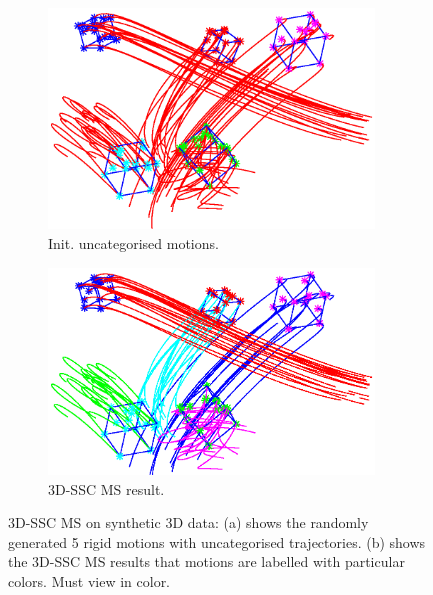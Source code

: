 \documentclass[10pt,twocolumn,letterpaper]{article}  %
\begin{document}
\begin{figure}[hb]
\centering
	\begin{subfigure}{0.5\textwidth}
  	\centering
 	\includegraphics[height=0.1\textheight, width=0.95\textwidth]{image/multiMotGenSingle.eps}
  	\caption{Init. uncategorised motions.}
  	\label{fig:multiMotGen}
	\end{subfigure}%
	\begin{subfigure}{0.5\textwidth}
 	\centering
  	\includegraphics[height=0.1\textheight, width=0.95\textwidth]{image/multiMotGenSeg.eps}
  	\caption{3D-SSC MS result.}
  	\label{fig:multiMotGenSeg} 
  	\end{subfigure}%
  	\caption{3D-SSC MS on synthetic 3D data: (a) shows the randomly generated 5 rigid motions with uncategorised trajectories. (b) shows the 3D-SSC MS results that motions are labelled with particular colors. Must view in color.}
  	   \vspace*{-0.3cm}
   \label{fig:MotSegSim}
\end{figure}
   \vspace*{-0.3cm}
\end{document}
